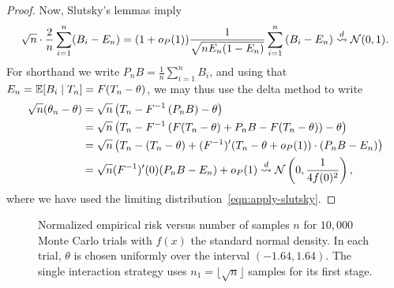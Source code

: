 \begin{proof}
  Now,
  Slutsky's lemmas imply
  \begin{equation}
    \sqrt{n}
    \cdot \frac{2}{n} \sum_{i = 1}^n (B_i - E_n)
    =
    (1 + o_P(1)) \frac{1}{\sqrt{n E_n(1 - E_n)}}
    \sum_{i = 1}^n \left(B_i - E_n\right)
    \stackrel{d}{\rightsquigarrow} \mathcal{N}(0, 1).
    \label{eqn:apply-slutsky}
  \end{equation}
  For shorthand we write $P_n B = \frac{1}{n} \sum_{i = 1}^n B_i$,
  and using that $E_n = \mathbb{E}[B_i \mid T_n] = F(T_n - \theta)$, we may thus
  use the delta method to write
  \begin{align*}
    \sqrt{n}(\theta_n - \theta)
    & = \sqrt{n}\left(T_n - F^{-1}\left(P_n B\right)
    - \theta \right) \\
    & = \sqrt{n} \left(T_n - F^{-1}\left(F(T_n - \theta)
    + P_n B - F(T_n - \theta)\right) - \theta \right) \\
    & = \sqrt{n} \left(T_n - (T_n - \theta )
    + (F^{-1})'(T_n - \theta + o_P(1))\cdot \left(
    P_n B - E_n\right) \right) \\
    & = \sqrt{n} (F^{-1})'(0) (P_n B - E_n)
    + o_P(1)
    \stackrel{d}{\rightsquigarrow} \mathcal{N}\left(0, \frac{1}{4 f(0)^2}\right),
  \end{align*}
  where we have used the limiting distribution~\eqref{eqn:apply-slutsky}.
\end{proof}
%

\begin{figure}
\begin{center}




\caption{Normalized empirical risk versus number of samples $n$ for $10,000$ Monte Carlo trials with $f(x)$ the standard normal density. In each trial, $\theta$ is chosen uniformly over the interval $(-1.64,1.64)$. The single interaction strategy uses $n_1 = \lfloor \sqrt{n} \rfloor$ samples for its first stage. 
\label{fig:adaptive_error}  }
\end{center}
\end{figure}
